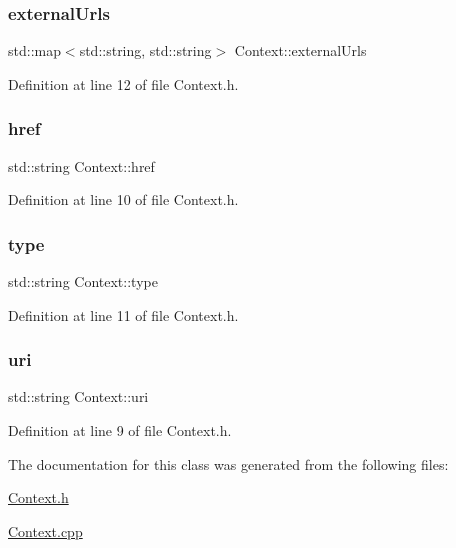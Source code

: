\subsubsection{\texorpdfstring{external\+Urls}{externalUrls}}
{\footnotesize\ttfamily std\+::map$<$std\+::string, std\+::string$>$ Context\+::external\+Urls\hspace{0.3cm}{\ttfamily [private]}}



Definition at line 12 of file Context.\+h.

\mbox{\label{class_context_ac95f2e8776510d2525cd26416a788cd9}} 
\subsubsection{\texorpdfstring{href}{href}}
{\footnotesize\ttfamily std\+::string Context\+::href\hspace{0.3cm}{\ttfamily [private]}}



Definition at line 10 of file Context.\+h.

\mbox{\label{class_context_a1a213fba0a70195f2f11b0dad9071675}} 
\subsubsection{\texorpdfstring{type}{type}}
{\footnotesize\ttfamily std\+::string Context\+::type\hspace{0.3cm}{\ttfamily [private]}}



Definition at line 11 of file Context.\+h.

\mbox{\label{class_context_a445ae3f5c89ae990daa476a82f81c7b1}} 
\subsubsection{\texorpdfstring{uri}{uri}}
{\footnotesize\ttfamily std\+::string Context\+::uri\hspace{0.3cm}{\ttfamily [private]}}



Definition at line 9 of file Context.\+h.



The documentation for this class was generated from the following files\+:\begin{DoxyCompactItemize}
\item 
\mbox{\hyperlink{_context_8h}{Context.\+h}}\item 
\mbox{\hyperlink{_context_8cpp}{Context.\+cpp}}\end{DoxyCompactItemize}
